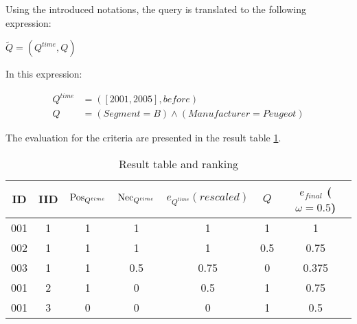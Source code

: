 Using the introduced notations, the query is translated to the following expression:

\vspace{-10pt}

\begin{center}
$\tilde{Q} = \left(Q^{time}, Q\right)$
\end{center}

\vspace{-10pt}

In this expression:

\vspace{-15pt}

\begin{align}
Q^{time} & = \left(\left[ 2001, 2005 \right], before\right) \\
Q & = \left(Segment =  B\right) \wedge \left(Manufacturer = Peugeot\right)
\end{align}

The evaluation for the criteria are presented in the result table \ref{tb:results}.

\begin{table}[ht]
\caption{Result table and ranking}
\centering
\begin{tabular}{c c c c c c c}
\hline
ID & IID &  $\operatorname{Pos}_{Q^{time}}$ & $\operatorname{Nec}_{Q^{time}}$ & $e_{Q^{time}} (rescaled)$ & $Q$ & $e_{final}$ ($\omega=0.5$) \\ [0.5ex]
\hline
001 & 1 & 1 &  1 & 1 & 1 & 1 \\
002 & 1 & 1 & 1 & 1 & 0.5 & 0.75 \\
003 & 1 & 1 & 0.5 & 0.75 &0 & 0.375\\
001 & 2 & 1 & 0 & 0.5 &1 & 0.75 \\
001 & 3 & 0 & 0 & 0 &1 & 0.5\\
\hline
\end{tabular}
\label{tb:results}
\end{table}




